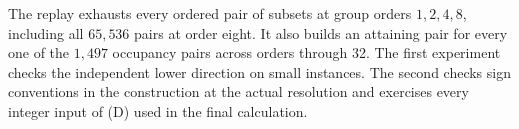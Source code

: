 The replay exhausts every ordered pair of subsets at group orders \(1,2,4,8\), including all \(65{,}536\) pairs at order eight. It also builds an attaining pair for every one of the \(1{,}497\) occupancy pairs across orders through 32. The first experiment checks the independent lower direction on small instances. The second checks sign conventions in the construction at the actual resolution and exercises every integer input of (D) used in the final calculation.
